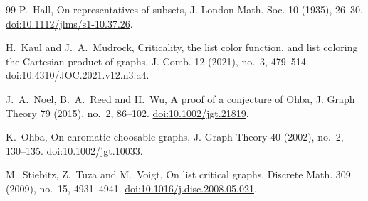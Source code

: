 \documentclass[11pt,a4paper,reqno]{amsart}
\theoremstyle{definition}
\theoremstyle{remark}
\begin{document}
\begin{thebibliography}{99}
P.~Hall, On representatives of subsets, J. London Math. Soc. 10 (1935), 26--30. \href{https://doi.org/10.1112/jlms/s1-10.37.26}{doi:10.1112/jlms/s1-10.37.26}.

H.~Kaul and J.~A.~Mudrock, Criticality, the list color function, and list coloring the Cartesian product of graphs, J. Comb. 12 (2021), no.~3, 479--514. \href{https://doi.org/10.4310/JOC.2021.v12.n3.a4}{doi:10.4310/\allowbreak JOC.2021.v12.n3.a4}.

J.~A.~Noel, B.~A.~Reed and H.~Wu, A proof of a conjecture of Ohba, J. Graph Theory 79 (2015), no.~2, 86--102. \href{https://doi.org/10.1002/jgt.21819}{doi:10.1002/jgt.21819}.

K.~Ohba, On chromatic-choosable graphs, J. Graph Theory 40 (2002), no.~2, 130--135. \href{https://doi.org/10.1002/jgt.10033}{doi:10.1002/jgt.10033}.

M.~Stiebitz, Z.~Tuza and M.~Voigt, On list critical graphs, Discrete Math. 309 (2009), no.~15, 4931--4941. \href{https://doi.org/10.1016/j.disc.2008.05.021}{doi:10.1016/j.disc.2008.05.021}.

\end{thebibliography}
\endgroup
\end{document}
